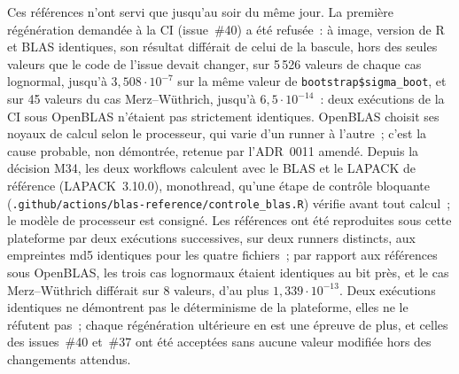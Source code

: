 \documentclass[a4paper,11pt]{article}
\newcommand{\code}[1]{\texttt{\small #1}}
\begin{document}
Ces références n'ont servi que jusqu'au soir du même jour. La première régénération demandée à
la CI (issue~\#40) a été refusée~: à image, version de R et BLAS identiques, son résultat
différait de celui de la bascule, hors des seules valeurs que le code de l'issue devait changer, sur 5\,526 valeurs de chaque cas
lognormal, jusqu'à $3{,}508\cdot 10^{-7}$ sur la même valeur de \code{bootstrap\$sigma\_boot},
et sur 45 valeurs du cas Merz--Wüthrich, jusqu'à $6{,}5\cdot 10^{-14}$~: deux exécutions de la
CI sous OpenBLAS n'étaient pas strictement identiques. OpenBLAS choisit ses noyaux de calcul
selon le processeur, qui varie d'un runner à l'autre~; c'est la cause probable, non démontrée,
retenue par l'ADR~0011 amendé. Depuis la décision M34, les deux workflows calculent avec le BLAS
et le LAPACK de référence (LAPACK~3.10.0), monothread, qu'une étape de contrôle bloquante
(\code{.github/actions/blas-reference/controle\_blas.R}) vérifie avant tout calcul~; le modèle
de processeur est consigné. Les références ont été reproduites sous cette plateforme par deux
exécutions successives, sur deux runners distincts, aux empreintes md5 identiques pour les quatre
fichiers~; par rapport aux références sous OpenBLAS, les trois cas lognormaux étaient identiques
au bit près, et le cas Merz--Wüthrich différait sur 8 valeurs, d'au plus
$1{,}339\cdot 10^{-13}$. Deux exécutions identiques ne démontrent pas le déterminisme de la
plateforme, elles ne le réfutent pas~; chaque régénération ultérieure en est une épreuve de plus,
et celles des issues~\#40 et~\#37 ont été acceptées sans aucune valeur modifiée hors des
changements attendus.
\end{document}
